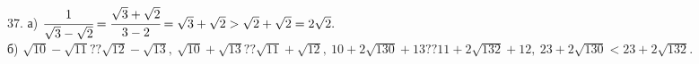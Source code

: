 37. а) $\cfrac{1}{\sqrt{3}-\sqrt{2}}=\cfrac{\sqrt{3}+\sqrt{2}}{3-2}=\sqrt{3}+\sqrt{2}>\sqrt{2}+\sqrt{2}=2\sqrt{2}.$\\
б) $\sqrt{10}-\sqrt{11}??\sqrt{12}-\sqrt{13},\ \sqrt{10}+\sqrt{13}??\sqrt{11}+\sqrt{12},\ 10+2\sqrt{130}+13??11+2\sqrt{132}+12,\ 23+2\sqrt{130}<23+2\sqrt{132}.$\\
